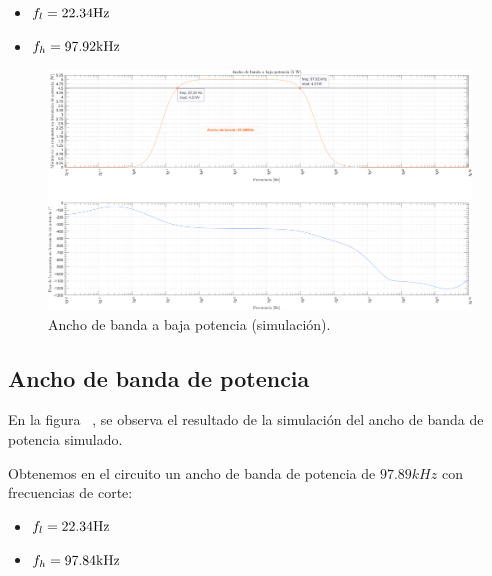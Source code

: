 \begin{itemize}
    \item $f_l =22.34 \si[per-mode=symbol]{\hertz}$
    \item $f_h =97.92 \si[per-mode=symbol]{\kilo\hertz}$
\end{itemize}

\vfill

\clearpage

\begin{figure}[H]
    \centering
    \includegraphics[height=0.66 \textwidth, angle=90]{./img/simulaciones/BW/Low_power_BW.png}    \caption{Ancho de banda a baja potencia (simulación).}
    \label{fig:Low_power_BW}
\end{figure}


\subsection{Ancho de banda de potencia}

\par En la figura ~, se observa el resultado de la simulación del ancho de banda de potencia simulado.
\par Obtenemos en el circuito un ancho de banda de potencia de $97.89kHz$ con frecuencias de corte:

\begin{itemize}
    \item $f_l = 22.34 \si[per-mode=symbol]{\hertz}$
    \item $f_h = 97.84 \si[per-mode=symbol]{\kilo\hertz}$
\end{itemize}

\vfill

\clearpage

